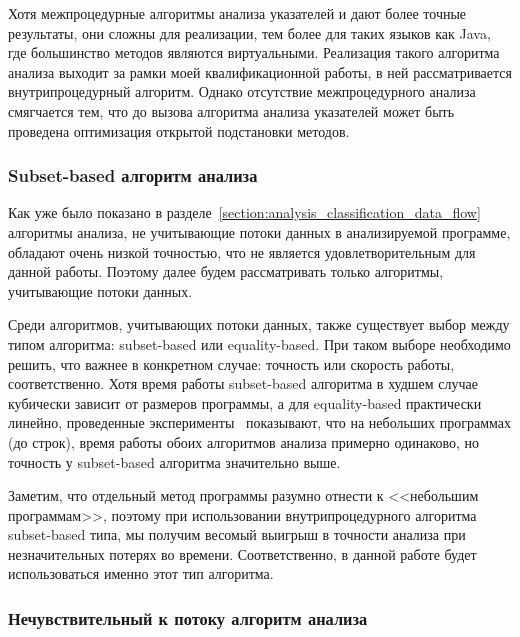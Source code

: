 \documentclass[14pt,titlepage]{extarticle}
\newcommand{\num}[1]{\numprint{#1}}
\newcommand{\eng}[1]{{\English#1}}
\newcommand{\java}{\eng{Java}\xspace}
\begin{document}
        Хотя межпроцедурные алгоритмы анализа указателей и дают более точные
        результаты, они сложны для реализации, тем более для таких
        языков как \java, где большинство методов являются виртуальными.
        Реализация такого алгоритма анализа выходит за рамки моей
        квалификационной работы, в ней рассматривается внутрипроцедурный
        алгоритм. Однако отсутствие межпроцедурного анализа смягчается тем, что
        до вызова алгоритма анализа указателей может быть проведена
        оптимизация открытой подстановки методов.

      \subsubsection{\texorpdfstring{\eng{Subset-based} алгоритм анализа}
                                    {Subset-based алгоритм анализа}}

        Как уже было показано в
        разделе~\ref{section:analysis_classification_data_flow}
        алгоритмы анализа, не учитывающие потоки данных в анализируемой
        программе, обладают очень низкой точностью, что не является
        удовлетворительным для данной работы. Поэтому далее будем рассматривать
        только алгоритмы, учитывающие потоки данных.

        Среди алгоритмов, учитывающих потоки данных, также существует выбор
        между типом алгоритма: \eng{subset-based} или \eng{equality-based}.
        При таком выборе необходимо решить, что важнее в конкретном
        случае: точность или скорость работы, соответственно.
        Хотя время работы \eng{subset-based} алгоритма в худшем случае
        кубически зависит от размеров программы, а для \eng{equality-based}
        практически линейно, проведенные
        эксперименты~\cite{shapiro_fast_and_accurate} показывают, что на
        небольших программах (до \num{3000} строк), время работы обоих
        алгоритмов анализа примерно одинаково, но точность у \eng{subset-based}
        алгоритма значительно выше.

        Заметим, что отдельный метод программы разумно отнести к <<небольшим
        программам>>, поэтому при использовании внутрипроцедурного алгоритма
        \eng{subset-based} типа, мы получим весомый выигрыш в точности анализа
        при незначительных потерях во времени. Соответственно, в данной работе
        будет использоваться именно этот тип алгоритма.

      \subsubsection{Нечувствительный к потоку алгоритм анализа}
        \label{section:flow_sensetive_analysis}
\end{document}
